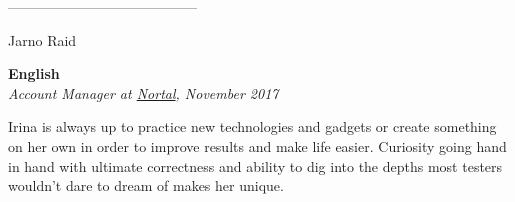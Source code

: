 \documentclass[a4paper, 12pt]{article}
\begin{document}
\begin{center}
\------------------------------------------
\end{center}

\begin{center}
\LARGE{Jarno Raid}
\end{center}

\begin{center}
\textbf{English}\\
\textit{Account Manager at \href{https://nortal.com}{Nortal}, November 2017}
\end{center}

Irina is always up to practice new technologies and gadgets or create something on her own in order to improve results and make life easier. Curiosity going hand in hand with ultimate correctness and ability to dig into the depths most testers wouldn't dare to dream of makes her unique.
\end{document}
